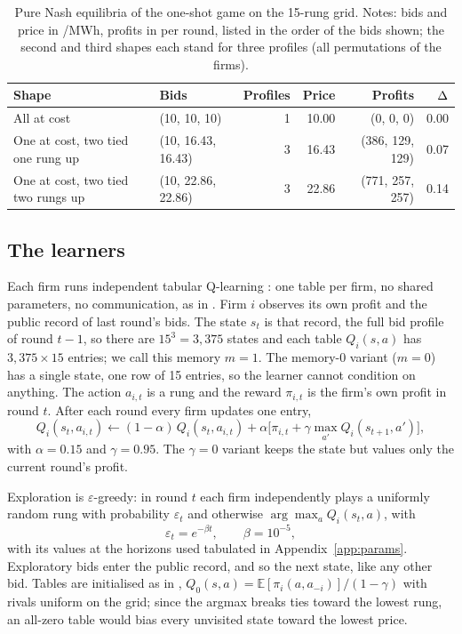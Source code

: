 \begin{table}[t]
\caption{Pure Nash equilibria of the one-shot game on the 15-rung grid. Notes: bids and price in \eur{}/MWh, profits in \eur{} per round, listed in the order of the bids shown; the second and third shapes each stand for three profiles (all permutations of the firms).}
\label{tab:nash}
\centering
\small
\begin{tabular}{llrrrr}
\toprule
Shape & Bids & Profiles & Price & Profits & $\Delta$ \\
\midrule
All at cost & (10, 10, 10) & 1 & 10.00 & (0, 0, 0) & 0.00 \\
One at cost, two tied one rung up & (10, 16.43, 16.43) & 3 & 16.43 & (386, 129, 129) & 0.07 \\
One at cost, two tied two rungs up & (10, 22.86, 22.86) & 3 & 22.86 & (771, 257, 257) & 0.14 \\
\bottomrule
\end{tabular}
\end{table}

\subsection{The learners}\label{sec:learners}

Each firm runs independent tabular Q-learning \citep{watkins1992}: one table per firm, no shared parameters, no communication, as in \citet{calvano2020}. Firm $i$ observes its own profit and the public record of last round's bids. The state $s_t$ is that record, the full bid profile of round $t-1$, so there are $15^3 = 3{,}375$ states and each table $Q_i(s, a)$ has $3{,}375 \times 15$ entries; we call this memory $m = 1$. The memory-0 variant ($m = 0$) has a single state, one row of 15 entries, so the learner cannot condition on anything. The action $a_{i,t}$ is a rung and the reward $\pi_{i,t}$ is the firm's own profit in round $t$. After each round every firm updates one entry,
\begin{equation}
Q_i(s_t, a_{i,t}) \leftarrow (1 - \alpha)\, Q_i(s_t, a_{i,t}) + \alpha \Big[ \pi_{i,t} + \gamma \max_{a'} Q_i(s_{t+1}, a') \Big],
\label{eq:qupdate}
\end{equation}
with $\alpha = 0.15$ and $\gamma = 0.95$. The $\gamma = 0$ variant keeps the state but values only the current round's profit.

Exploration is $\varepsilon$-greedy: in round $t$ each firm independently plays a uniformly random rung with probability $\varepsilon_t$ and otherwise $\arg\max_a Q_i(s_t, a)$, with
\begin{equation}
\varepsilon_t = e^{-\beta t}, \qquad \beta = 10^{-5},
\end{equation}
with its values at the horizons used tabulated in Appendix~\ref{app:params}. Exploratory bids enter the public record, and so the next state, like any other bid. Tables are initialised as in \citet{calvano2020}, $Q_0(s, a) = \mathbb{E}[\pi_i(a, a_{-i})]/(1 - \gamma)$ with rivals uniform on the grid; since the argmax breaks ties toward the lowest rung, an all-zero table would bias every unvisited state toward the lowest price.

